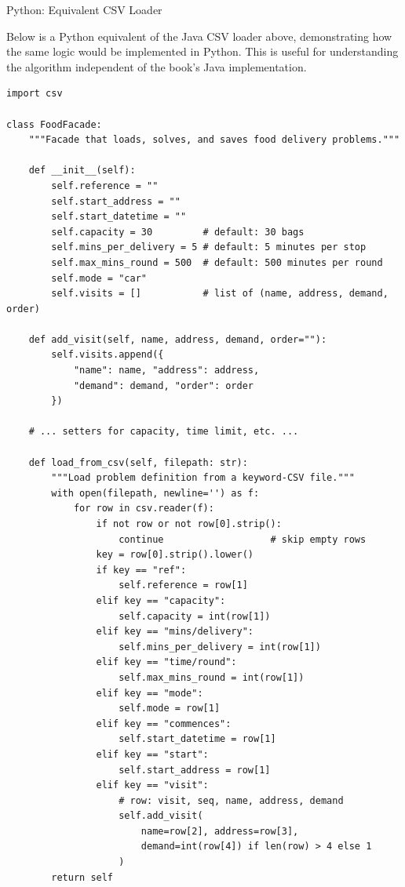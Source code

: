 \documentclass[aspectratio=169,10pt]{beamer}
\begin{document}
\begin{frame}[fragile]{Python: Equivalent CSV Loader}

  Below is a Python equivalent of the Java CSV loader above,
  demonstrating how the same logic would be implemented in Python.
  This is useful for understanding the algorithm independent of
  the book's Java implementation.

\begin{lstlisting}[style=python,
    caption={Python equivalent of the food delivery CSV loader.},
    label={lst:python_loader}]
import csv

class FoodFacade:
    """Facade that loads, solves, and saves food delivery problems."""

    def __init__(self):
        self.reference = ""
        self.start_address = ""
        self.start_datetime = ""
        self.capacity = 30         # default: 30 bags
        self.mins_per_delivery = 5 # default: 5 minutes per stop
        self.max_mins_round = 500  # default: 500 minutes per round
        self.mode = "car"
        self.visits = []           # list of (name, address, demand, order)

    def add_visit(self, name, address, demand, order=""):
        self.visits.append({
            "name": name, "address": address,
            "demand": demand, "order": order
        })

    # ... setters for capacity, time limit, etc. ...

    def load_from_csv(self, filepath: str):
        """Load problem definition from a keyword-CSV file."""
        with open(filepath, newline='') as f:
            for row in csv.reader(f):
                if not row or not row[0].strip():
                    continue                   # skip empty rows
                key = row[0].strip().lower()
                if key == "ref":
                    self.reference = row[1]
                elif key == "capacity":
                    self.capacity = int(row[1])
                elif key == "mins/delivery":
                    self.mins_per_delivery = int(row[1])
                elif key == "time/round":
                    self.max_mins_round = int(row[1])
                elif key == "mode":
                    self.mode = row[1]
                elif key == "commences":
                    self.start_datetime = row[1]
                elif key == "start":
                    self.start_address = row[1]
                elif key == "visit":
                    # row: visit, seq, name, address, demand
                    self.add_visit(
                        name=row[2], address=row[3],
                        demand=int(row[4]) if len(row) > 4 else 1
                    )
        return self


\end{lstlisting}
\end{frame}
\end{document}
